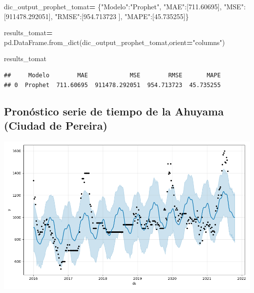 \documentclass[
]{book}
\newenvironment{Shaded}{\begin{snugshade}}{\end{snugshade}}
\newcommand{\FloatTok}[1]{\textcolor[rgb]{0.00,0.00,0.81}{#1}}
\newcommand{\NormalTok}[1]{#1}
\newcommand{\OperatorTok}[1]{\textcolor[rgb]{0.81,0.36,0.00}{\textbf{#1}}}
\newcommand{\StringTok}[1]{\textcolor[rgb]{0.31,0.60,0.02}{#1}}
\begin{document}
\begin{Shaded}
\begin{Highlighting}[]

\NormalTok{dic\_output\_prophet\_tomat}\OperatorTok{=}\NormalTok{ \{}\StringTok{"Modelo"}\NormalTok{:}\StringTok{"Prophet"}\NormalTok{,}
                 \StringTok{"MAE"}\NormalTok{:[}\FloatTok{711.60695}\NormalTok{],}
                 \StringTok{"MSE"}\NormalTok{:[}\FloatTok{911478.292051}\NormalTok{],}
                 \StringTok{"RMSE"}\NormalTok{:[}\FloatTok{954.713723}\NormalTok{ ],}
                 \StringTok{"MAPE"}\NormalTok{:[}\FloatTok{45.735255}\NormalTok{]\}}

\NormalTok{results\_tomat}\OperatorTok{=}\NormalTok{ pd.DataFrame.from\_dict(dic\_output\_prophet\_tomat,orient}\OperatorTok{=}\StringTok{"columns"}\NormalTok{)}

\NormalTok{results\_tomat}
\end{Highlighting}
\end{Shaded}

\begin{verbatim}
##     Modelo        MAE            MSE        RMSE       MAPE
## 0  Prophet  711.60695  911478.292051  954.713723  45.735255
\end{verbatim}

\hypertarget{pronuxf3stico-serie-de-tiempo-de-la-ahuyama-ciudad-de-pereira-2}{%
\subsection{Pronóstico serie de tiempo de la Ahuyama (Ciudad de Pereira)}\label{pronuxf3stico-serie-de-tiempo-de-la-ahuyama-ciudad-de-pereira-2}}

\includegraphics{Prophet_Ahuyama_PER.png}
\end{document}
